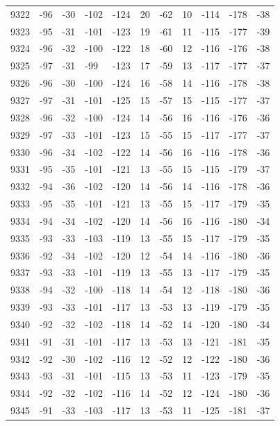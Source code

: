 \begin{table}[H]
\begin{tabular}{lllllllllll}
9322 & -96 & -30 & -102 & -124 & 20 & -62 & 10 & -114 & -178 & -38 \\
9323 & -95 & -31 & -101 & -123 & 19 & -61 & 11 & -115 & -177 & -39 \\
9324 & -96 & -32 & -100 & -122 & 18 & -60 & 12 & -116 & -176 & -38 \\
9325 & -97 & -31 & -99 & -123 & 17 & -59 & 13 & -117 & -177 & -37 \\
9326 & -96 & -30 & -100 & -124 & 16 & -58 & 14 & -116 & -178 & -38 \\
9327 & -97 & -31 & -101 & -125 & 15 & -57 & 15 & -115 & -177 & -37 \\
9328 & -96 & -32 & -100 & -124 & 14 & -56 & 16 & -116 & -176 & -36 \\
9329 & -97 & -33 & -101 & -123 & 15 & -55 & 15 & -117 & -177 & -37 \\
9330 & -96 & -34 & -102 & -122 & 14 & -56 & 16 & -116 & -178 & -36 \\
9331 & -95 & -35 & -101 & -121 & 13 & -55 & 15 & -115 & -179 & -37 \\
9332 & -94 & -36 & -102 & -120 & 14 & -56 & 14 & -116 & -178 & -36 \\
9333 & -95 & -35 & -101 & -121 & 13 & -55 & 15 & -117 & -179 & -35 \\
9334 & -94 & -34 & -102 & -120 & 14 & -56 & 16 & -116 & -180 & -34 \\
9335 & -93 & -33 & -103 & -119 & 13 & -55 & 15 & -117 & -179 & -35 \\
9336 & -92 & -34 & -102 & -120 & 12 & -54 & 14 & -116 & -180 & -36 \\
9337 & -93 & -33 & -101 & -119 & 13 & -55 & 13 & -117 & -179 & -35 \\
9338 & -94 & -32 & -100 & -118 & 14 & -54 & 12 & -118 & -180 & -36 \\
9339 & -93 & -33 & -101 & -117 & 13 & -53 & 13 & -119 & -179 & -35 \\
9340 & -92 & -32 & -102 & -118 & 14 & -52 & 14 & -120 & -180 & -34 \\
9341 & -91 & -31 & -101 & -117 & 13 & -53 & 13 & -121 & -181 & -35 \\
9342 & -92 & -30 & -102 & -116 & 12 & -52 & 12 & -122 & -180 & -36 \\
9343 & -93 & -31 & -101 & -115 & 13 & -53 & 11 & -123 & -179 & -35 \\
9344 & -92 & -32 & -102 & -116 & 14 & -52 & 12 & -124 & -180 & -36 \\
9345 & -91 & -33 & -103 & -117 & 13 & -53 & 11 & -125 & -181 & -37 \\

\end{tabular}
\end{table}

